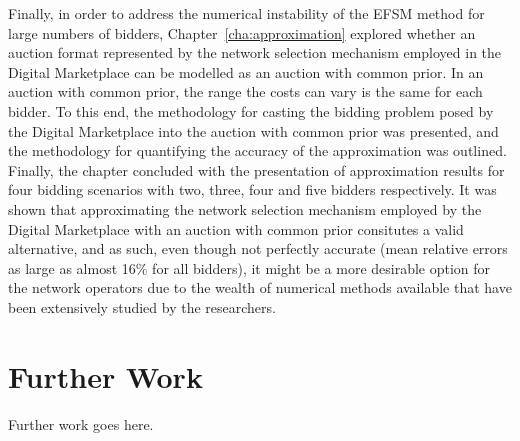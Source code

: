 Finally, in order to address the numerical instability of the EFSM method for large numbers of bidders, Chapter~\ref{cha:approximation} explored whether an auction format represented by the network selection mechanism employed in the Digital Marketplace can be modelled as an auction with common prior. In an auction with common prior, the range the costs can vary is the same for each bidder. To this end, the methodology for casting the bidding problem posed by the Digital Marketplace into the auction with common prior was presented, and the methodology for quantifying the accuracy of the approximation was outlined. Finally, the chapter concluded with the presentation of approximation results for four bidding scenarios with two, three, four and five bidders respectively. It was shown that approximating the network selection mechanism employed by the Digital Marketplace with an auction with common prior consitutes a valid alternative, and as such, even though not perfectly accurate (mean relative errors as large as almost 16\% for all bidders), it might be a more desirable option for the network operators due to the wealth of numerical methods available that have been extensively studied by the researchers.

\section{Further Work} %
\label{sec:further_work_conclusions}
Further work goes here.
